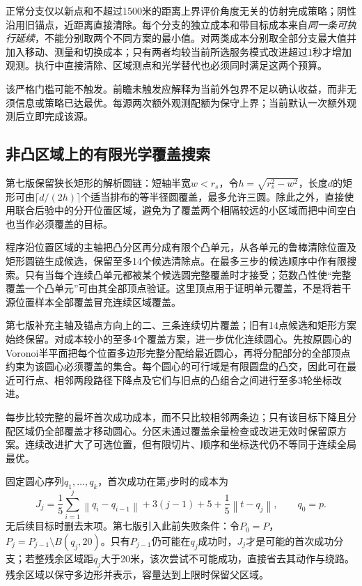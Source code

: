 \documentclass[UTF8,a4paper,zihao=-4,fontset=windows]{ctexart}
\newcommand{\norm}[1]{\left\lVert#1\right\rVert}
\begin{document}
正常分支仅以新点和不超过1500米的距离上界评价角度无关的仿射完成策略；阴性沿用旧锚点，近距离直接清除。每个分支的独立成本和带目标成本来自\emph{同一条可执行延续}，不能分别取两个不同方案的最小值。对两类成本分别取全部分支最大值并加入移动、测量和切换成本；只有两者均较当前所选服务模式改进超过1秒才增加观测。执行中直接清除、区域测点和光学替代也必须同时满足这两个预算。

该严格门槛可能不触发。前瞻未触发应解释为当前外包界不足以确认收益，而非无须信息或策略已达最优。每源两次额外观测配额为保守上界；当前默认一次额外观测后立即完成该源。

\subsection{非凸区域上的有限光学覆盖搜索}
第七版保留狭长矩形的解析圆链：短轴半宽$w<r_s$，令$h=\sqrt{r_s^2-w^2}$，长度$d$的矩形可由$\lceil d/(2h)\rceil$个适当排布的等半径圆覆盖，最多允许三圆。除此之外，直接使用联合后验中的分开位置区域，避免为了覆盖两个相隔较远的小区域而把中间空白也当作必须覆盖的目标。

程序沿位置区域的主轴把凸分区再分成有限个凸单元，从各单元的鲁棒清除位置及矩形圆链生成候选，保留至多14个候选清除点。在最多三步的候选顺序中作有限搜索。只有当每个连续凸单元都被某个候选圆完整覆盖时才接受；范数凸性使“完整覆盖一个凸单元”可由其全部顶点验证。这里顶点用于证明单元覆盖，不是将若干源位置样本全部覆盖冒充连续区域覆盖。

第七版补充主轴及锚点方向上的二、三条连续切片覆盖；旧有14点候选和矩形方案始终保留。对成本较小的至多4个覆盖方案，进一步优化连续圆心。先按原圆心的Voronoi半平面把每个位置多边形完整分配给最近圆心，再将分配部分的全部顶点约束为该圆心必须覆盖的集合。每个圆心的可行域是有限圆盘的凸交，因此可在最近可行点、相邻两段路径下降点及它们与旧点的凸组合之间进行至多3轮坐标改进。

每步比较完整的最坏首次成功成本，而不只比较相邻两条边；只有该目标下降且分配区域仍全部覆盖才移动圆心。分区未通过覆盖余量检查或改进无效时保留原方案。连续改进扩大了可选位置，但有限切片、顺序和坐标迭代仍不等同于连续全局最优。

固定圆心序列$q_1,\ldots,q_k$，首次成功在第$j$步时的成本为
\begin{equation}\label{eq:opticalcost}
J_j=\frac15\sum_{i=1}^{j}\norm{q_i-q_{i-1}}+3(j-1)+5
+\frac15\norm{t-q_j},\qquad q_0=p.
\end{equation}
无后续目标时删去末项。第七版引入此前失败条件：令$P_0=P$，$P_j=P_{j-1}\setminus B(q_j,20)$。只有$P_{j-1}$仍可能在$q_j$成功时，$J_j$才是可能的首次成功分支；若整残余区域距$q_j$大于20米，该次尝试不可能成功，直接省去其动作与绕路。残余区域以保守多边形并表示，容量达到上限时保留父区域。
\end{document}

